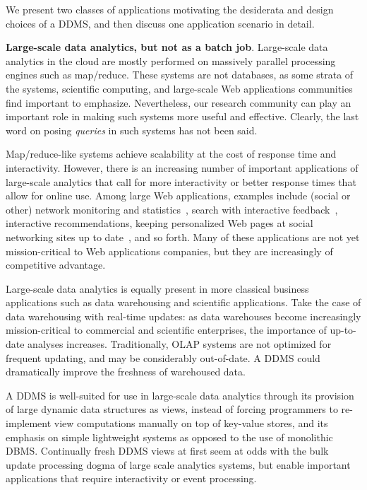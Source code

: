 
\medskip

We present two classes of applications motivating the de\-si\-derata and
design choices of a DDMS, and then discuss one application scenario in detail.

{\bf Large-scale data analytics, but not as a batch job}\/.
%
Large-scale data analytics in the cloud are mostly performed on massively
parallel processing engines such as map/reduce. These systems are not databases,
as some strata of the systems, scientific computing, and large-scale Web
applications communities find important to emphasize. Nevertheless, our research
community can play an important role in making such systems more useful and
effective. Clearly, the last word on posing {\em queries}\/ in such systems
has not been said.

Map/reduce-like systems achieve scalability at the cost of response time and
interactivity.
However, there is an increasing number of important applications of large-scale
analytics that call for more interactivity or better response times that allow
for online use. Among large Web applications, examples include (social or other)
network monitoring and statistics~\cite{olston-cidr:09}, search with interactive
feedback~\cite{bast-cidr:07}, interactive recommendations, keeping personalized
Web pages at social networking sites up to date~\cite{fu-sigmod:10}, and so
forth.
Many of these applications are not yet mission-critical to Web applications
companies, but they are increasingly of competitive advantage.

Large-scale data analytics is equally present in more classical business
applications such as data warehousing and scientific applications. Take the
case of data warehousing with real-time updates: as data warehouses become
increasingly mission-critical to commercial and scientific enterprises, the
importance of up-to-date analyses increases. Traditionally, OLAP systems are not
optimized for frequent updating, and may be considerably out-of-date. A DDMS 
could dramatically improve the freshness of warehoused data.

A DDMS is well-suited for use in large-scale data analytics through its provision of
large dynamic data structures as views, instead of forcing programmers to
re-implement view computations manually on top of key-value stores, and its
emphasis on simple lightweight systems as opposed to the use of monolithic DBMS.
Continually fresh DDMS views at first seem at odds with the bulk update
processing dogma of large scale analytics systems, but enable important
applications that require interactivity or event processing.


